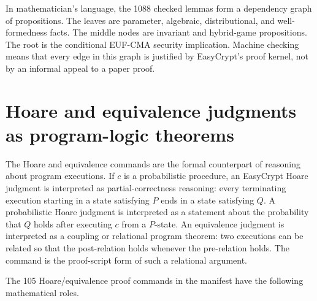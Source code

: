In mathematician's language, the 1088 checked lemmas form a dependency graph of
propositions.  The leaves are parameter, algebraic, distributional, and
well-formedness facts.  The middle nodes are invariant and hybrid-game
propositions.  The root is the conditional EUF-CMA security implication.
Machine checking means that every edge in this graph is justified by
EasyCrypt's proof kernel, not by an informal appeal to a paper proof.

\section{Hoare and equivalence judgments as program-logic theorems}
\label{app:hoare-equiv-as-program-logic}

The Hoare and equivalence commands are the formal counterpart of reasoning about
program executions.  If \(c\) is a probabilistic procedure, an EasyCrypt Hoare
judgment 
is interpreted as partial-correctness reasoning: every terminating execution
starting in a state satisfying \(P\) ends in a state satisfying \(Q\).  A
probabilistic Hoare judgment 
is interpreted as a statement about the probability that \(Q\) holds after
executing \(c\) from a \(P\)-state.  An equivalence judgment
is interpreted as a coupling or relational program theorem: two executions can
be related so that the post-relation holds whenever the pre-relation holds.
The command  is the proof-script form of such a relational
argument.

The 105 Hoare/equivalence proof commands in the manifest have the following
mathematical roles.

